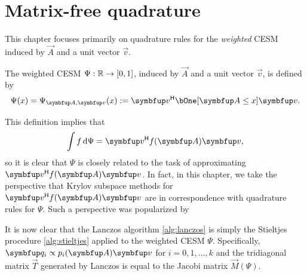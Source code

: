 \chapter{Matrix-free quadrature}
\label{chap:QF}

    This chapter focuses primarily on quadrature rules for the \emph{weighted} CESM induced by \( \vec{A} \) and a unit vector \( \vec{v} \).
    \begin{definition}
    \label{def:wCESM}
        The weighted CESM \( \Psi : \mathbb{R}\to[0,1] \), induced by \( \vec{A} \) and a unit vector \( \vec{v} \), is defined by
    \begin{equation*}
        \Psi(x)
        = \Psi_{\vec{A},\vec{v}}(x)
        := \vec{v}^\cT \bOne[\vec{A}\leq x] \vec{v}.
    \end{equation*}
    \end{definition}
    This definition implies that
    \begin{equation*}
        \int f \,\d\Psi = \vec{v}^\cT \fA \vec{v},
    \end{equation*}
    so it is clear that \( \Psi \) is closely related to the task of approximating \( \vec{v}^\cT \fA \vec{v} \). 
    In fact, in this chapter, we take the perspective that Krylov subspace methods for \( \vec{v}^\cT \fA \vec{v} \) are in correspondence with quadrature rules for \( \Psi \).
    Such a perspective was popularized by \cite{golub_meurant_94,golub_meurant_09}

    \begin{remark}
        It is now clear that the Lanczos algorithm \cref{alg:lanczos} is simply the Stieltjes procedure \cref{alg:stieltjes} applied to the weighted CESM \( \Psi \).
        Specifically, \( \vec{q}_i \propto p_i\A\vec{v} \) for \( i=0,1,\ldots, k \) and the tridiagonal matrix \( \vec{T} \) generated by Lanczos is equal to the Jacobi matrix \( \vec{M}(\Psi) \).
    \end{remark}


